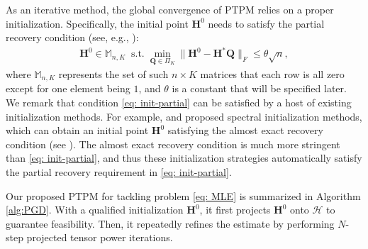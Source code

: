 \documentclass{article}
\theoremstyle{plain}
\theoremstyle{definition}
\theoremstyle{remark}
\newcommand{\BM}{\mathbb{M}}
\newcommand{\BH}{\bm{H}}
\newcommand{\BQ}{\bm{Q}}
\newcommand{\HCal}{\mathcal{H}}
\begin{document}
As an iterative method, the global convergence of PTPM relies on a proper initialization. Specifically, the initial point $\BH^0$ needs to satisfy the partial recovery condition (see, e.g., \citet{dumitriu2021partial}):
\begin{align} \label{eq: init-partial}
	\bm{H}^0 \in \BM_{n,K} \;  \operatorname{s.t.} \min_{\BQ \in \Pi_K } \| \bm{H}^0 - \bm{H}^* \BQ\|_F \leq \theta \sqrt{n},
\end{align}
where $\BM_{n,K}$ represents the set of such $n \times K$ matrices that each row is all zero except for one element being $1$, and $\theta$ is a constant that will be specified later. We remark that condition \eqref{eq: init-partial} can be satisfied by a host of existing initialization methods. For example, \citet{chien2019minimax} and \citet{zhang2022exact} proposed spectral initialization methods, which can obtain an initial point $\bm{H}^0$ satisfying the almost exact recovery condition (see \citet[Definition 4]{abbe2017community}). The almost exact recovery condition is much more stringent than \eqref{eq: init-partial}, and thus these initialization strategies automatically satisfy the partial recovery requirement in \eqref{eq: init-partial}.

Our proposed PTPM for tackling problem \eqref{eq: MLE} is summarized in Algorithm \ref{alg:PGD}. With a qualified initialization $\BH^0$, it first projects $\BH^0$ onto $\HCal$ to guarantee feasibility. Then, it repeatedly refines the estimate by performing $N$-step projected tensor power iterations.
\end{document}
